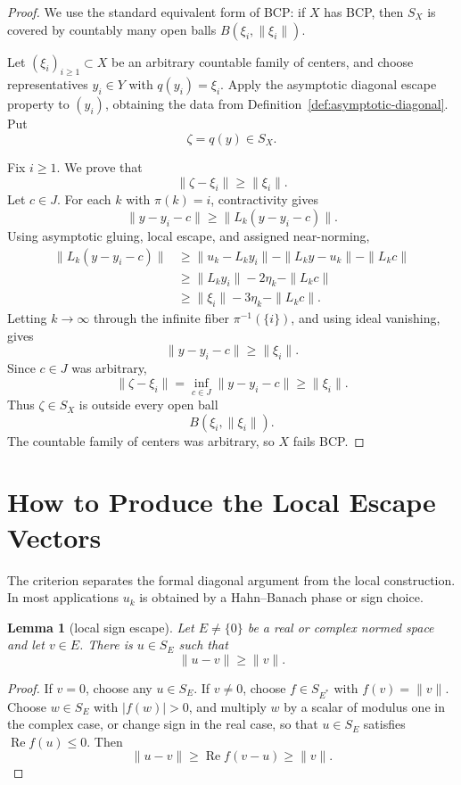 \documentclass[11pt]{article}
\newtheorem{lemma}{Lemma}
\begin{document}
\begin{proof}
We use the standard equivalent form of BCP: if \(X\) has BCP, then \(S_X\) is
covered by countably many open balls \(B(\xi_i,\|\xi_i\|)\).

Let \((\xi_i)_{i\ge1}\subset X\) be an arbitrary countable family of centers,
and choose representatives \(y_i\in Y\) with \(q(y_i)=\xi_i\).  Apply the
asymptotic diagonal escape property to \((y_i)\), obtaining the data from
Definition~\ref{def:asymptotic-diagonal}.  Put
\[
        \zeta=q(y)\in S_X.
\]

Fix \(i\ge1\).  We prove that
\[
        \|\zeta-\xi_i\|\ge \|\xi_i\|.
\]
Let \(c\in J\).  For each \(k\) with \(\pi(k)=i\), contractivity gives
\[
        \|y-y_i-c\|
        \ge
        \|L_k(y-y_i-c)\|.
\]
Using asymptotic gluing, local escape, and assigned near-norming,
\begin{align*}
        \|L_k(y-y_i-c)\|
        &\ge
        \|u_k-L_ky_i\|-\|L_ky-u_k\|-\|L_kc\|\\
        &\ge
        \|L_ky_i\|-2\eta_k-\|L_kc\|\\
        &\ge
        \|\xi_i\|-3\eta_k-\|L_kc\|.
\end{align*}
Letting \(k\to\infty\) through the infinite fiber \(\pi^{-1}(\{i\})\), and
using ideal vanishing, gives
\[
        \|y-y_i-c\|\ge \|\xi_i\|.
\]
Since \(c\in J\) was arbitrary,
\[
        \|\zeta-\xi_i\|
        =
        \inf_{c\in J}\|y-y_i-c\|
        \ge
        \|\xi_i\|.
\]
Thus \(\zeta\in S_X\) is outside every open ball
\[
        B(\xi_i,\|\xi_i\|).
\]
The countable family of centers was arbitrary, so \(X\) fails BCP.
\end{proof}

\section*{How to Produce the Local Escape Vectors}

The criterion separates the formal diagonal argument from the local
construction.  In most applications \(u_k\) is obtained by a Hahn--Banach
phase or sign choice.

\begin{lemma}[local sign escape]
\label{lem:local-sign}
Let \(E\ne\{0\}\) be a real or complex normed space and let \(v\in E\).  There
is \(u\in S_E\) such that
\[
        \|u-v\|\ge \|v\|.
\]
\end{lemma}

\begin{proof}
If \(v=0\), choose any \(u\in S_E\).  If \(v\ne0\), choose \(f\in S_{E^*}\)
with \(f(v)=\|v\|\).  Choose \(w\in S_E\) with \(|f(w)|>0\), and multiply
\(w\) by a scalar of modulus one in the complex case, or change sign in the
real case, so that \(u\in S_E\) satisfies \(\operatorname{Re}f(u)\le0\).
Then
\[
        \|u-v\|\ge \operatorname{Re}f(v-u)\ge \|v\|.
\]
\end{proof}
\end{document}
